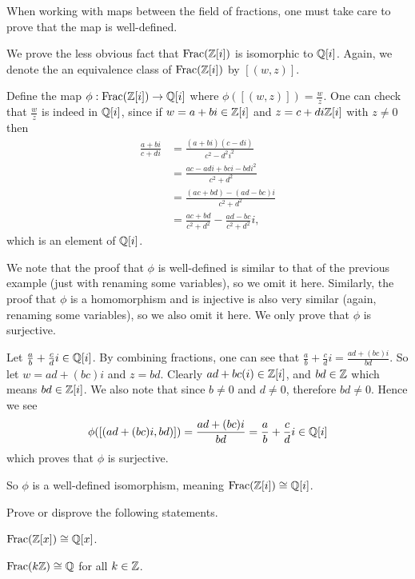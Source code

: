 \begin{remark}
    When working with maps between the field of fractions, one must take care to prove that the map is well-defined.
\end{remark}

\begin{example}\label{example-field-of-fractions-of-gaussian-integers-isomorphic-to-quadratic-integers-of-i}
    We prove the less obvious fact that $\mathrm{Frac}(\mathbb{Z}[i])$ is isomorphic to $\mathbb{Q}[i]$. Again, we denote the an equivalence class of $\mathrm{Frac}(\mathbb{Z}[i])$ by $[(w, z)]$.
    
    Define the map $\phi: \mathrm{Frac}(\mathbb{Z}[i]) \to \mathbb{Q}[i]$ where $\phi([(w, z)]) = \frac wz$. One can check that $\frac wz$ is indeed in $\mathbb{Q}[i]$, since if $w = a+bi\in\mathbb{Z}[i]$ and $z = c+di\mathbb{Z}[i]$ with $z \neq 0$ then
    \begin{align*}
        \frac{a+bi}{c+di} &= \frac{(a+bi)(c-di)}{c^2 - d^2i^2}\\
        &= \frac{ac-adi+bci-bdi^2}{c^2+d^2}\\
        &= \frac{(ac+bd) - (ad-bc)i}{c^2+d^2}\\
        &= \frac{ac+bd}{c^2+d^2} - \frac{ad-bc}{c^2+d^2}i,
    \end{align*}
    which is an element of $\mathbb{Q}[i]$.

    We note that the proof that $\phi$ is well-defined is similar to that of the previous example (just with renaming some variables), so we omit it here. Similarly, the proof that $\phi$ is a homomorphism and is injective is also very similar (again, renaming some variables), so we also omit it here. We only prove that $\phi$ is surjective.

    Let $\frac ab + \frac cd i \in \mathbb{Q}[i]$. By combining fractions, one can see that $\frac ab + \frac cd i = \frac{ad+(bc)i}{bd}$. So let $w = ad + (bc)i$ and $z = bd$. Clearly $ad + bc(i) \in \mathbb{Z}[i]$, and $bd \in \mathbb{Z}$ which means $bd \in \mathbb{Z}[i]$. We also note that since $b\neq 0$ and $d \neq 0$, therefore $bd \neq 0$. Hence we see
    \[
        \phi([(ad+(bc)i, bd)]) = \frac{ad+(bc)i}{bd} = \frac ab + \frac cd i \in \mathbb{Q}[i]
    \]
    which proves that $\phi$ is surjective.

    So $\phi$ is a well-defined isomorphism, meaning $\mathrm{Frac}(\mathbb{Z}[i]) \cong \mathbb{Q}[i]$.
\end{example}

\begin{exercise}
    Prove or disprove the following statements.
    \begin{partquestions}{\alph*}
        \item $\mathrm{Frac}(\mathbb{Z}[x]) \cong \mathbb{Q}[x]$.
        \item $\mathrm{Frac}(k\mathbb{Z}) \cong \mathbb{Q}$ for all $k \in \mathbb{Z}$.
    \end{partquestions}
\end{exercise}

